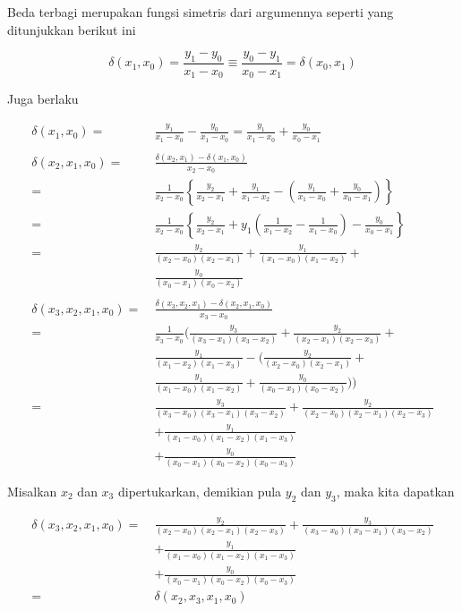 Beda terbagi merupakan fungsi simetris dari argumennya seperti yang ditunjukkan berikut ini

\begin{equation*}
\delta(x_1,x_0) = \frac{y_1-y_0}{x_1-x_0} \equiv \frac{y_0 - y_1}{x_0 - x_1} = \delta (x_0, x_1)
\end{equation*}

Juga berlaku

\begin{equation*}
\begin{split}
\delta(x_1,x_0) =~& \frac{y_1}{x_1 - x_0} - \frac{y_0}{x_1 - x_0} = \frac{y_1}{x_1 - x_0} + \frac{y_0}{x_0 - x_1}\\
\\
\delta(x_2,x_1,x_0) =~& \frac{\delta(x_2, x_1)-\delta(x_1,x_0)}{x_2 - x_0}\\
=~& \frac{1}{x_2-x_0}\left\{ \frac{y_2}{x_2-x_1}+\frac{y_1}{x_1-x_2}-\left(\frac{y_1}{x_1-x_0}+\frac{y_0}{x_0-x_1}\right)\right\}\\
=~& \frac{1}{x_2-x_0}\left\{ \frac{y_2}{x_2-x_1}+y_1\left(\frac{1}{x_1-x_2}-\frac{1}{x_1-x_0}\right)-\frac{y_0}{x_0-x_1}\right\}\\
=~& \frac{y_2}{(x_2-x_0)(x_2-x_1)} + \frac{y_1}{(x_1-x_0)(x_1-x_2)}+\\
& \frac{y_0}{(x_0-x_1)(x_0-x_2)}\\
\\
\delta (x_3,x_2,x_1,x_0) =~& \frac{\delta (x_3,x_2,x_1)-\delta (x_2,x_1,x_0)}{x_3-x_0}\\
=~& \frac{1}{x_3-x_0}\Bigg(\frac{y_3}{(x_3-x_1)(x_3-x_2)} + \frac{y_2}{(x_2-x_1)(x_2-x_3)} + \\
& \frac{y_1}{(x_1-x_2)(x_1-x_3)} - \bigg( \frac{y_2}{(x_2-x_0)(x_2-x_1)} +  \\
& \frac{y_1}{(x_1-x_0)(x_1-x_2)} + \frac{y_0}{(x_0-x_1)(x_0-x_2)} \bigg)\Bigg)\\
=~& \frac{y_3}{(x_3-x_0)(x_3-x_1)(x_3-x_2)} + \frac{y_2}{(x_2-x_0)(x_2-x_1)(x_2-x_3)}\\
&+ \frac{y_1}{(x_1-x_0)(x_1-x_2)(x_1-x_3)} \\
&+ \frac{y_0}{(x_0-x_1)(x_0-x_2)(x_0-x_3)}
\end{split}
\end{equation*}

Misalkan $x_2$ dan $x_3$ dipertukarkan, demikian pula $y_2$ dan $y_3$, maka kita dapatkan

\begin{equation*}
\begin{split}
\delta(x_3,x_2,x_1,x_0) =~& \frac{y_2}{(x_2-x_0)(x_2-x_1)(x_2-x_3)} + \frac{y_3}{(x_3-x_0)(x_3-x_1)(x_3-x_2)}\\
&+\frac{y_1}{(x_1-x_0)(x_1-x_2)(x_1-x_3)} \\
&+ \frac{y_0}{(x_0-x_1)(x_0-x_2)(x_0-x_3)}\\
=~& \delta(x_2,x_3,x_1,x_0)
\end{split}
\end{equation*}

